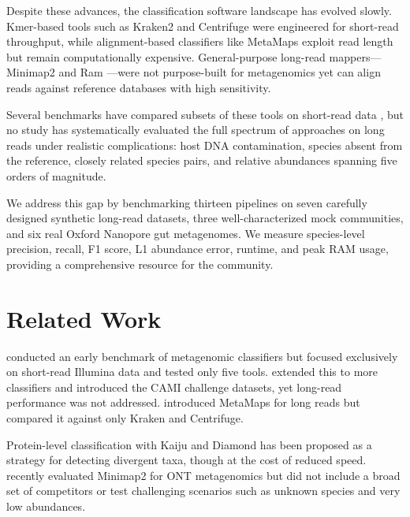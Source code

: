\documentclass[12pt]{article}
\begin{document}
Despite these advances, the classification software landscape has evolved slowly. Kmer-based tools such as Kraken2 \citep{wood2019improved} and Centrifuge \citep{kim2016centrifuge} were engineered for short-read throughput, while alignment-based classifiers like MetaMaps \citep{dilthey2019strain} exploit read length but remain computationally expensive. General-purpose long-read mappers---Minimap2 \citep{li2018minimap2} and Ram \citep{vaser2021time}---were not purpose-built for metagenomics yet can align reads against reference databases with high sensitivity.

Several benchmarks have compared subsets of these tools on short-read data \citep{mcintyre2017comprehensive, ye2019benchmarking}, but no study has systematically evaluated the full spectrum of approaches on long reads under realistic complications: host DNA contamination, species absent from the reference, closely related species pairs, and relative abundances spanning five orders of magnitude.

We address this gap by benchmarking thirteen pipelines on seven carefully designed synthetic long-read datasets, three well-characterized mock communities, and six real Oxford Nanopore gut metagenomes. We measure species-level precision, recall, F1 score, L1 abundance error, runtime, and peak RAM usage, providing a comprehensive resource for the community.

\section{Related Work}

\citet{mcintyre2017comprehensive} conducted an early benchmark of metagenomic classifiers but focused exclusively on short-read Illumina data and tested only five tools. \citet{ye2019benchmarking} extended this to more classifiers and introduced the CAMI challenge datasets, yet long-read performance was not addressed. \citet{dilthey2019strain} introduced MetaMaps for long reads but compared it against only Kraken and Centrifuge.

Protein-level classification with Kaiju \citep{menzel2016fast} and Diamond \citep{buchfink2021sensitive} has been proposed as a strategy for detecting divergent taxa, though at the cost of reduced speed. \citet{portik2022evaluation} recently evaluated Minimap2 for ONT metagenomics but did not include a broad set of competitors or test challenging scenarios such as unknown species and very low abundances.
\end{document}
